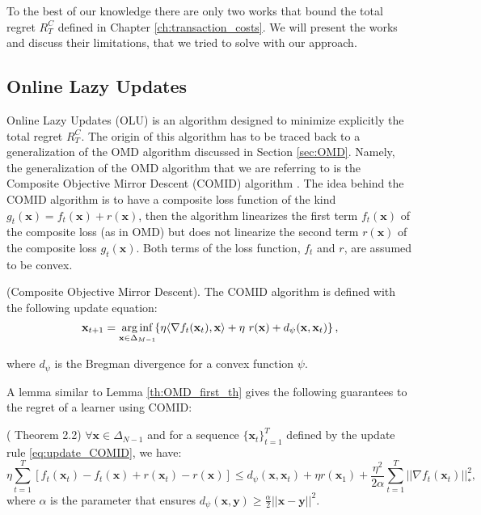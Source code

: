 To the best of our knowledge there are only two works that bound the total regret $R_T^C$ defined in Chapter \ref{ch:transaction_costs}. We will present the works and discuss their limitations, that we tried to solve with our approach.

\subsection{Online Lazy Updates}

Online Lazy Updates (OLU) \cite{das2013online} is an algorithm designed to minimize explicitly the total regret $R_T^C$. The origin of this algorithm has to be traced back to a generalization of the OMD algorithm discussed in Section \ref{sec:OMD}. Namely, the generalization of the OMD algorithm that we are referring to is the Composite Objective Mirror Descent (COMID) algorithm \cite{duchi2010composite}. The idea behind the COMID algorithm is to have a composite loss function of the kind $g_t(\mathbf x)=f_t(\mathbf x) + r(\mathbf x)$, then the algorithm linearizes the first term $f_t(\mathbf x)$ of the composite loss (as in OMD) but does not linearize the second term $r(\mathbf x)$ of the composite loss $g_t(\mathbf x)$. Both terms of the loss function, $f_t$ and $r$, are assumed to be convex.

\begin{definition}(Composite Objective Mirror Descent).\label{def:COMID}
The COMID algorithm is defined with the following update equation:
\begin{equation}\label{eq:update_COMID}
    \mathbf{x}_{t+1}=\arginf\limits_{\mathbf{x} \in \Delta_{M-1}} \hspace{-0.1cm} \left\{ \eta \langle \nabla f_t(\mathbf{x}_t), \mathbf{x} \rangle + \eta \ r(\mathbf{x}) + d_\psi(\mathbf{x}, \mathbf{x}_t) \right\},
\end{equation}

where $d_\psi$ is the Bregman divergence for a convex function $\psi$. 

\end{definition}

A lemma similar to Lemma \ref{th:OMD_first_th} gives the following guarantees to the regret of a learner using COMID:

\begin{lemma}(\cite{duchi2010composite} Theorem 2.2)
$\forall \mathbf x\in\Delta_{N-1}$ and for a sequence $\{\mathbf x_t\}_{t=1}^T$ defined by the update rule \eqref{eq:update_COMID}, we have:
\begin{equation}
\eta\sum\limits_{t=1}^T[f_t(\mathbf x_t)-f_t(\mathbf x)+r(\mathbf x_t)-r(\mathbf x)]\le d_\psi(\mathbf x,\mathbf x_t)+\eta r(\mathbf x_1)+\frac{\eta^2}{2\alpha}\sum\limits_{t=1}^T||\nabla f_t(\mathbf x_t)||_*^2,
\end{equation} 
where $\alpha$ is the parameter that ensures $d_\psi(\mathbf x,\mathbf y)\ge \frac{\alpha}{2}||\mathbf x-\mathbf y||^2$.
\end{lemma}

